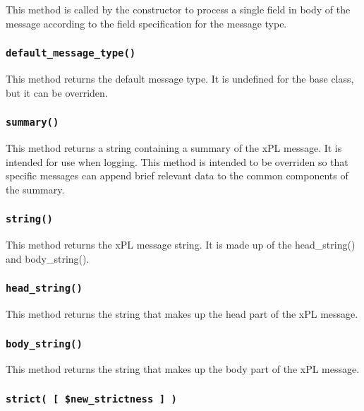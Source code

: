 This method is called by the constructor to process a single field
in body of the message according to the field specification for the
message type.

\subsubsection*{\texttt{default\_message\_type()}\label{xPL::Message_default_message_type_}}


This method returns the default message type.  It is undefined for
the base class, but it can be overriden.

\subsubsection*{\texttt{summary()}\label{xPL::Message_summary_}}


This method returns a string containing a summary of the xPL message.
It is intended for use when logging.  This method is intended to be
overriden so that specific messages can append brief relevant data
to the common components of the summary.

\subsubsection*{\texttt{string()}\label{xPL::Message_string_}}


This method returns the xPL message string.  It is made up of the
\textsf{head\_string()} and \textsf{body\_string()}.

\subsubsection*{\texttt{head\_string()}\label{xPL::Message_head_string_}}


This method returns the string that makes up the head part of the xPL
message.

\subsubsection*{\texttt{body\_string()}\label{xPL::Message_body_string_}}


This method returns the string that makes up the body part of the xPL
message.

\subsubsection*{\texttt{strict( [ \$new\_strictness ] )}\label{xPL::Message_strict_new_strictness_}}


